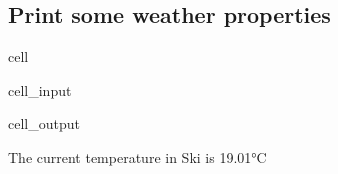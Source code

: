 \documentclass[letterpaper,10pt,english]{jupyterBook}
\begin{document}
\subsection{Print some weather properties}
\label{\detokenize{2_Data_sources/APIs/OpenWeather:print-some-weather-properties}}
\begin{sphinxuseclass}{cell}\begin{sphinxVerbatimInput}

\begin{sphinxuseclass}{cell_input}
\begin{sphinxVerbatim}[commandchars=\\\{\}]
  \PYG{p}{[}\PYG{p}{]}\PYG{p}{[}\PYG{p}{]}
  
\end{sphinxVerbatim}

\end{sphinxuseclass}\end{sphinxVerbatimInput}
\begin{sphinxVerbatimOutput}

\begin{sphinxuseclass}{cell_output}
\begin{sphinxVerbatim}[commandchars=\\\{\}]
The current temperature in Ski is 19.01°C
\end{sphinxVerbatim}

\end{sphinxuseclass}\end{sphinxVerbatimOutput}

\end{sphinxuseclass}
\end{document}
